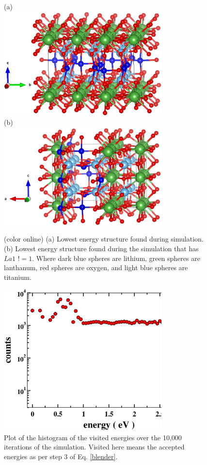 \documentclass[aps,pre,reprint,superscriptaddress,showkeys]{revtex4-2}
\begin{document}
\begin{figure}
(a)\\
\vspace{1cm}
\includegraphics[width=8.6cm]{fig10a.eps}\\
\vspace{1cm}
(b)\\
\vspace{1cm}
\includegraphics[width=8.6cm]{fig10b.eps}
\caption{(color online) (a) Lowest energy structure found during simulation. (b)  Lowest energy structure found during the simulation that has $La1$  $!= 1$. Where dark blue spheres are lithium, green spheres are lanthanum, red spheres are oxygen, and light blue spheres  are titanium. \label{lowen_structures}}
\end{figure}

\begin{figure}
\includegraphics[width=8.6cm]{fig11.eps}
\caption{Plot of the histogram of the visited energies over the 10,000 iterations of the simulation. Visited here means the accepted energies as per step 3 of Eq. \ref{blender}.\label{Htot}}
\end{figure}
\end{document}
